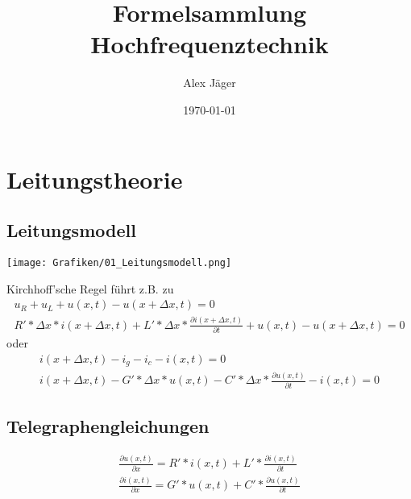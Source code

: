 \documentclass[11pt]{scrartcl}
\author{Alex Jäger}
\title{Formelsammlung Hochfrequenztechnik}
\date{\today}
\begin{document}
\maketitle
\newpage
\section{Leitungstheorie}
\subsection{Leitungsmodell}
\begin{center}
	\texttt{[image: Grafiken/01\_Leitungsmodell.png]}
\end{center}
Kirchhoff'sche Regel führt z.B. zu
\begin{gather*}
	u_R+u_L+u(x,t)-u(x+\Delta x,t)=0 \\	
	R'*\Delta x*i(x+\Delta x,t)+L'*\Delta x*\frac{\partial i(x+\Delta x,t)}{\partial t}+u(x,t)-u(x+\Delta x,t)=0
\end{gather*}
oder
\begin{gather*}
	i(x+\Delta x,t)-i_g-i_c-i(x,t)=0 \\
	i(x+\Delta x,t)-G'*\Delta x*u(x,t)-C'*\Delta x*\frac{\partial u(x,t)}{\partial t}-i(x,t)=0
\end{gather*}

\subsection{Telegraphengleichungen}
\begin{eqnarray}
	\frac{\partial u(x,t)}{\partial x}=R'*i(x,t)+L'*\frac{\partial i(x,t)}{\partial t}\\
	\frac{\partial i(x,t)}{\partial x}=G'*u(x,t)+C'*\frac{\partial u(x,t)}{\partial t}
\end{eqnarray}


	

 
\end{document}
